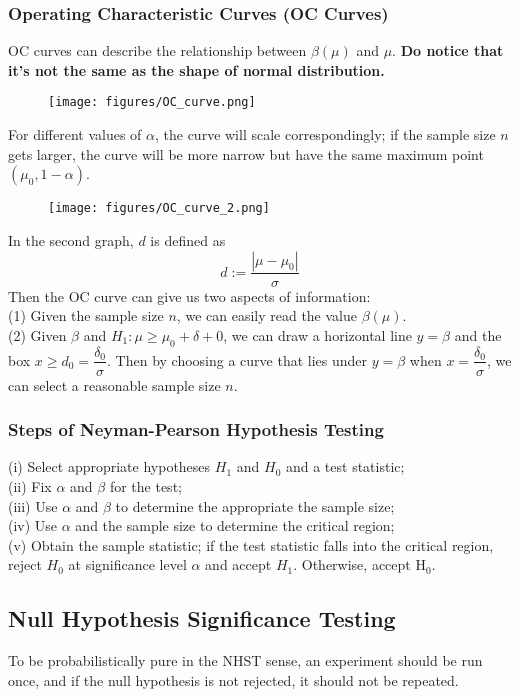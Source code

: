\documentclass[a4paper,12pt]{article}
\begin{document}
\subsubsection{Operating Characteristic Curves (OC Curves)}
OC curves can describe the relationship between $\beta(\mu)$ and $\mu$. \textbf{Do notice that it's not the same as the shape of normal distribution.}
\begin{figure}[!h] 
    \centering
    \texttt{[image: figures/OC\_curve.png]} 
\end{figure}
For different values of $\alpha$, the curve will scale correspondingly; if the sample size $n$ gets larger, the curve will be more narrow but have the same maximum point $(\mu_0, 1-\alpha)$.\\
\begin{figure}[!h]
    \centering
    \texttt{[image: figures/OC\_curve\_2.png]} 
\end{figure}
In the second graph, $d$ is defined as 
\begin{equation}
d:=\dfrac{|\mu-\mu_0|}{\sigma}
\end{equation}
Then the OC curve can give us two aspects of information:\\
(1) Given the sample size $n$, we can easily read the value $\beta(\mu)$.\\
(2) Given $\beta$ and $H_1: \mu \geq \mu_0 + \delta+0$, we can draw a horizontal line $y=\beta$ and the box $x\geq d_0 = \dfrac{\delta_0}{\sigma}$. Then by choosing a curve that lies under $y=\beta$ when $x=\dfrac{\delta_0}{\sigma}$, we can select a reasonable sample size $n$.
\subsubsection{Steps of Neyman-Pearson Hypothesis Testing}
(i) Select appropriate hypotheses $H_1$ and $H_0$ and a test statistic;\\
(ii) Fix $\alpha$ and $\beta$ for the test;\\
(iii) Use $\alpha$ and $\beta$ to determine the appropriate the sample size;\\
(iv) Use $\alpha$ and the sample size to determine the critical region;\\
(v) Obtain the sample statistic; if the test statistic falls into the critical region, reject $H_0$ at significance level $\alpha$ and accept $H_1$. Otherwise, accept $\mathrm{H}_0$.

\subsection{Null Hypothesis Significance Testing}
To be probabilistically pure in the NHST sense, an experiment should be run once, and if the null hypothesis is not rejected, it should not be repeated.
\end{document}
